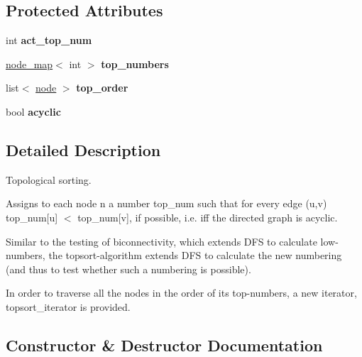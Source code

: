 \subsection*{Protected Attributes}
\begin{DoxyCompactItemize}
\item 
\mbox{\label{classtopsort_ae04dea9ee7f97be6e0e9673afb601f96}} 
int {\bfseries act\+\_\+top\+\_\+num}
\item 
\mbox{\label{classtopsort_ae57da1aae22ed92acd0d84c737a1da2b}} 
\mbox{\hyperlink{classnode__map}{node\+\_\+map}}$<$ int $>$ {\bfseries top\+\_\+numbers}
\item 
\mbox{\label{classtopsort_aaff79afb24dd71820c936be2b88027ee}} 
list$<$ \mbox{\hyperlink{classnode}{node}} $>$ {\bfseries top\+\_\+order}
\item 
\mbox{\label{classtopsort_a01d94e7627a5660836cc0765ec15727a}} 
bool {\bfseries acyclic}
\end{DoxyCompactItemize}


\subsection{Detailed Description}
Topological sorting. 

Assigns to each node {\ttfamily n} a number {\ttfamily top\+\_\+num} such that for every edge {\ttfamily (u,v)} {\ttfamily top\+\_\+num\mbox{[}u\mbox{]}} $<$ {\ttfamily top\+\_\+num\mbox{[}v\mbox{]}}, if possible, i.\+e. iff the directed graph is acyclic. ~\newline
 

Similar to the testing of biconnectivity, which extends D\+FS to calculate low-\/numbers, the topsort-\/algorithm extends D\+FS to calculate the new numbering (and thus to test whether such a numbering is possible).

In order to traverse all the nodes in the order of its top-\/numbers, a new iterator, {\ttfamily topsort\+\_\+iterator} is provided. 

\subsection{Constructor \& Destructor Documentation}
\mbox{\label{classtopsort_a76a9055969b9dbf006320040be9fd5e6}} 
